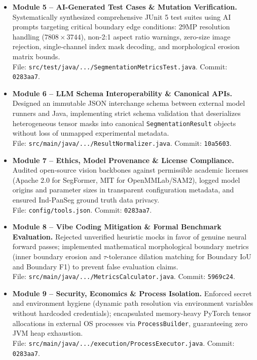 \documentclass[10pt,a4paper]{article}
\begin{document}
\begin{itemize}[leftmargin=*,itemsep=1.2pt]
  \item \textbf{Module 5 -- AI-Generated Test Cases \& Mutation Verification.} Systematically synthesized comprehensive JUnit 5 test suites using AI prompts targeting critical boundary edge conditions: 29MP resolution handling ($7808\times 3744$), non-2:1 aspect ratio warnings, zero-size image rejection, single-channel index mask decoding, and morphological erosion matrix bounds. \\
  File: \texttt{src/test/java/.../SegmentationMetricsTest.java}. Commit: \texttt{0283aa7}.
  
  \item \textbf{Module 6 -- LLM Schema Interoperability \& Canonical APIs.} Designed an immutable JSON interchange schema between external model runners and Java, implementing strict schema validation that deserializes heterogeneous tensor masks into canonical \texttt{SegmentationResult} objects without loss of unmapped experimental metadata. \\
  File: \texttt{src/main/java/.../ResultNormalizer.java}. Commit: \texttt{10a5603}.
  
  \item \textbf{Module 7 -- Ethics, Model Provenance \& License Compliance.} Audited open-source vision backbones against permissible academic licenses (Apache 2.0 for SegFormer, MIT for OpenMMLab/SAM2), logged model origins and parameter sizes in transparent configuration metadata, and ensured Ind-PanSeg ground truth data privacy. \\
  File: \texttt{config/tools.json}. Commit: \texttt{0283aa7}.
  
  \item \textbf{Module 8 -- Vibe Coding Mitigation \& Formal Benchmark Evaluation.} Rejected unverified heuristic mocks in favor of genuine neural forward passes; implemented mathematical morphological boundary metrics (inner boundary erosion and $\tau$-tolerance dilation matching for Boundary IoU and Boundary F1) to prevent false evaluation claims. \\
  File: \texttt{src/main/java/.../MetricsCalculator.java}. Commit: \texttt{5969c24}.
  
  \item \textbf{Module 9 -- Security, Economics \& Process Isolation.} Enforced secret and environment hygiene (dynamic path resolution via environment variables without hardcoded credentials); encapsulated memory-heavy PyTorch tensor allocations in external OS processes via \texttt{ProcessBuilder}, guaranteeing zero JVM heap exhaustion. \\
  File: \texttt{src/main/java/.../execution/ProcessExecutor.java}. Commit: \texttt{0283aa7}.
\end{itemize}
\end{document}
